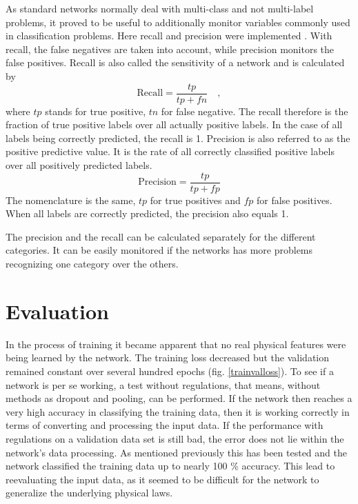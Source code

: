 As standard networks normally deal with multi-class and not multi-label problems, it proved to be useful to additionally monitor variables commonly used in classification problems. Here recall and precision were implemented \cite{rijsbergen}. With recall, the false negatives are taken into account, while precision monitors the false positives. Recall is also called the sensitivity of a network and is calculated by
\begin{equation}
\mathrm{Recall} = \frac{tp}{tp + fn} \quad ,
\label{recall}
\end{equation}
where $tp$ stands for true positive, $tn$ for false negative. The recall therefore is the fraction of true positive labels over all actually positive labels. In the case of all labels being correctly predicted, the recall is 1. Precision is also referred to as the positive predictive value. It is the rate of all correctly classified positive labels over all positively predicted labels.
\begin{equation}
\mathrm{Precision} = \frac{tp}{tp + fp}
\end{equation}
The nomenclature is the same, $tp$ for true positives and $fp$ for false positives. When all labels are correctly predicted, the precision also equals 1.

The precision and the recall can be calculated separately for the different categories. It can be easily monitored if the networks has more problems recognizing one category over the others. 
 
\section{Evaluation}
In the process of training it became apparent that no real physical features were being learned by the network. The training loss decreased but the validation remained constant over several hundred epochs (fig. \ref{trainvalloss}). To see if a network is per se working, a test without regulations, that means, without methods as dropout and pooling, can be performed. If the network then reaches a very high accuracy in classifying the training data, then it is working correctly in terms of converting and processing the input data. If the performance with regulations on a validation data set is still bad, the error does not lie within the network's data processing. As mentioned previously this has been tested and the network classified the training data up to nearly 100 \% accuracy. This lead to reevaluating the input data, as it seemed to be difficult for the network to generalize the underlying physical laws. 

